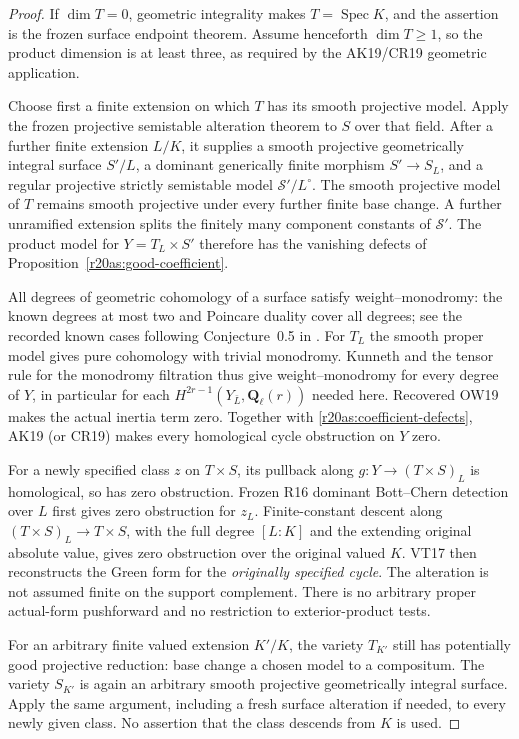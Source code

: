 \begin{proof}
If $\dim T=0$, geometric integrality makes $T=\operatorname{Spec}K$,
and the assertion is the frozen surface endpoint theorem.  Assume
henceforth $\dim T\ge1$, so the product dimension is at least three,
as required by the AK19/CR19 geometric application.

Choose first a finite extension on which $T$ has its smooth
projective model.  Apply the frozen projective semistable alteration
theorem to $S$ over that field.  After a further finite extension
$L/K$, it supplies a smooth projective geometrically integral surface
$S'/L$, a dominant generically finite morphism $S'\to S_L$, and a
regular projective strictly semistable model $\mathcal S'/L^\circ$.
The smooth projective model of $T$ remains smooth projective under
every further finite base change.  A further unramified extension
splits the finitely many component constants of $\mathcal S'$.
The product model for $Y=T_L\times S'$ therefore has the vanishing
defects of Proposition~\ref{r20as:good-coefficient}.

All degrees of geometric cohomology of a surface satisfy
weight--monodromy: the known degrees at most two and Poincare
duality cover all degrees; see the recorded known cases following
Conjecture~0.5 in \cite{AS20Saito}.  For $T_L$ the smooth proper
model gives pure cohomology with trivial monodromy.  Kunneth and
the tensor rule for the monodromy filtration thus give
weight--monodromy for every degree of $Y$, in particular for each
$H^{2r-1}(Y_{\bar L},\mathbf Q_\ell(r))$ needed here.  Recovered
OW19 makes the actual inertia term zero.  Together with
\eqref{r20as:coefficient-defects}, AK19 (or CR19) makes every
homological cycle obstruction on $Y$ zero.

For a newly specified class $z$ on $T\times S$, its pullback along
$g:Y\to(T\times S)_L$ is homological, so has zero obstruction.
Frozen R16 dominant Bott--Chern detection over $L$ first gives zero
obstruction for $z_L$.  Finite-constant descent along
$(T\times S)_L\to T\times S$, with the full degree $[L:K]$ and
the extending original absolute value, gives zero obstruction over
the original valued $K$.  VT17 then reconstructs the Green form for
the \emph{originally specified cycle}.  The alteration is not
assumed finite on the support complement.  There is no arbitrary
proper actual-form pushforward and no restriction to exterior-product
tests.

For an arbitrary finite valued extension $K'/K$, the variety $T_{K'}$
still has potentially good projective reduction: base change a
chosen model to a compositum.  The variety $S_{K'}$ is again an
arbitrary smooth projective geometrically integral surface.  Apply
the same argument, including a fresh surface alteration if needed,
to every newly given class.  No assertion that the class descends
from $K$ is used.
\end{proof}

